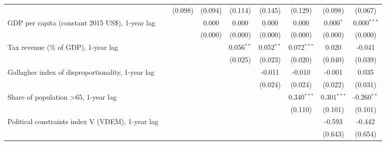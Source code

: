 \begin{table}[htbp]
\begin{tabular}{lcccccccc}
                                                                                                         &         & (0.098)     & (0.094) & (0.114)      & (0.145)      & (0.129)       & (0.098)       & (0.067)\\   
      GDP per capita (constant 2015 US\$), 1-year lag                                                    &         &             & 0.000   & 0.000        & 0.000        & 0.000         & 0.000$^{*}$   & 0.000$^{***}$\\   
                                                                                                         &         &             & (0.000) & (0.000)      & (0.000)      & (0.000)       & (0.000)       & (0.000)\\   
      Tax revenue (\% of GDP), 1-year lag                                                                &         &             &         & 0.056$^{**}$ & 0.052$^{**}$ & 0.072$^{***}$ & 0.020         & -0.041\\   
                                                                                                         &         &             &         & (0.025)      & (0.023)      & (0.020)       & (0.040)       & (0.039)\\   
      Gallagher index of disproportionality, 1-year lag                                                  &         &             &         &              & -0.011       & -0.010        & -0.001        & 0.035\\   
                                                                                                         &         &             &         &              & (0.024)      & (0.024)       & (0.022)       & (0.031)\\   
      Share of population >65, 1-year lag                                                                &         &             &         &              &              & 0.340$^{***}$ & 0.301$^{***}$ & -0.260$^{**}$\\   
                                                                                                         &         &             &         &              &              & (0.110)       & (0.101)       & (0.101)\\   
      Political constraints index V (VDEM), 1-year lag                                                   &         &             &         &              &              &               & -0.593        & -0.442\\   
                                                                                                         &         &             &         &              &              &               & (0.643)       & (0.654)\\   

\end{tabular}
\end{table}
